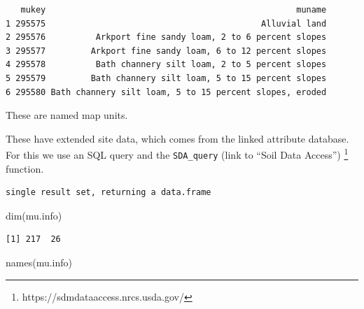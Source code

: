 \documentclass[
  letterpaper,
  DIV=11,
  numbers=noendperiod]{scrartcl}
\newenvironment{Shaded}{\begin{snugshade}}{\end{snugshade}}
\newcommand{\CommentTok}[1]{\textcolor[rgb]{0.37,0.37,0.37}{#1}}
\newcommand{\FunctionTok}[1]{\textcolor[rgb]{0.28,0.35,0.67}{#1}}
\newcommand{\NormalTok}[1]{\textcolor[rgb]{0.00,0.23,0.31}{#1}}
\newcommand{\OtherTok}[1]{\textcolor[rgb]{0.00,0.23,0.31}{#1}}
\newcommand{\SpecialCharTok}[1]{\textcolor[rgb]{0.37,0.37,0.37}{#1}}
\newcommand{\StringTok}[1]{\textcolor[rgb]{0.13,0.47,0.30}{#1}}
\begin{document}
\begin{verbatim}
   mukey                                                  muname
1 295575                                           Alluvial land
2 295576          Arkport fine sandy loam, 2 to 6 percent slopes
3 295577         Arkport fine sandy loam, 6 to 12 percent slopes
4 295578          Bath channery silt loam, 2 to 5 percent slopes
5 295579         Bath channery silt loam, 5 to 15 percent slopes
6 295580 Bath channery silt loam, 5 to 15 percent slopes, eroded
\end{verbatim}

These are named map units.

These have extended site data, which comes from the linked attribute
database. For this we use an SQL query and the \texttt{SDA\_query} (link
to ``Soil Data Access'') \footnote{https://sdmdataaccess.nrcs.usda.gov/}
function.

\begin{Shaded}
\end{Shaded}

\begin{verbatim}
single result set, returning a data.frame
\end{verbatim}

\begin{Shaded}
\begin{Highlighting}[]
\FunctionTok{dim}\NormalTok{(mu.info)}
\end{Highlighting}
\end{Shaded}

\begin{verbatim}
[1] 217  26
\end{verbatim}

\begin{Shaded}
\begin{Highlighting}[]
\FunctionTok{names}\NormalTok{(mu.info)}
\end{Highlighting}
\end{Shaded}
\end{document}
